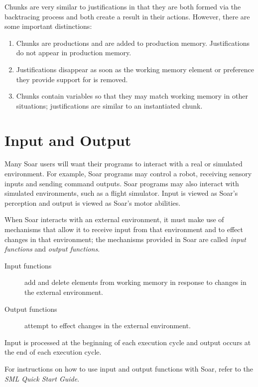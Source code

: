 Chunks are very similar to justifications in that they are both
formed via the backtracing process and both create a result in their
actions. However, there are some important distinctions:\vspace{-12pt}
\begin{enumerate}
\item Chunks are productions and are added to production memory.
	Justifications do not appear in production memory.\vspace{-8pt}
\item Justifications disappear as soon as the working memory element or
         preference they provide support
	for is removed. \vspace{-8pt}
\item Chunks contain variables so that they may match working memory in other
	situations; justifications are similar to an instantiated chunk.
\end{enumerate}




\section{Input and Output}
\label{ARCH-io}	%

Many Soar users will want their programs to interact with a real or simulated
environment. For example, Soar programs may control a robot, receiving sensory
inputs and sending command outputs. Soar programs may also interact with
simulated environments, such as a flight simulator. Input is viewed as
Soar's perception and output is viewed as Soar's motor abilities.

When Soar interacts with an external environment, it must make use of
mechanisms that allow it to receive input from that environment and to effect
changes in that environment; the mechanisms provided in Soar are called
\textit{input functions} and \textit{output functions}.

\begin{description}
\item[Input functions] add and delete elements from working memory in response
	to changes in the external environment.
\item[Output functions] attempt to effect changes in the external
	environment. 
\end{description}

Input is processed at the beginning of each execution cycle and output
occurs at the end of each execution cycle.

For instructions on how to use input and output functions with Soar, refer to the
\textit{SML Quick Start Guide}.




